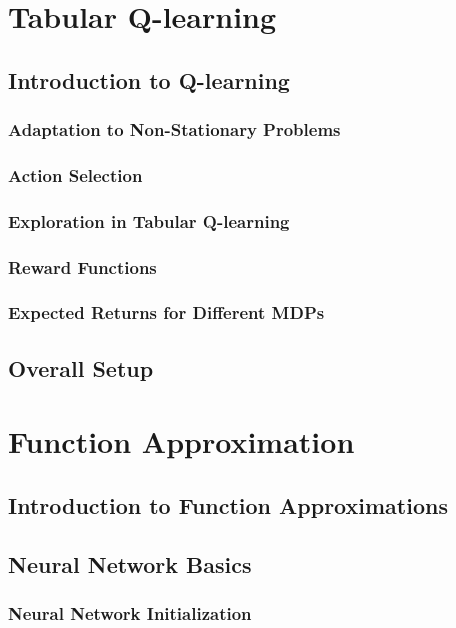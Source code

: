 \section{Tabular Q-learning}
\subsection{Introduction to Q-learning}
\subsubsection{Adaptation to Non-Stationary Problems}
\subsubsection{Action Selection}
\subsubsection{Exploration in Tabular Q-learning}
\subsubsection{Reward Functions}
\subsubsection{Expected Returns for Different MDPs}

\subsection{Overall Setup}



\section{Function Approximation}
\subsection{Introduction to Function Approximations}
\subsection{Neural Network Basics}
\subsubsection{Neural Network Initialization}
